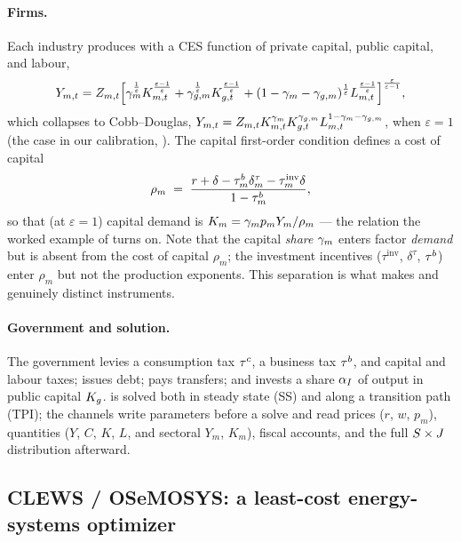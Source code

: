 \paragraph{Firms.}
Each industry produces with a CES function of private capital, public capital, and
labour,
\begin{equation}
  Y_{m,t} = Z_{m,t}\Bigl[\gamma_{m}^{\frac1\varepsilon}K_{m,t}^{\frac{\varepsilon-1}\varepsilon}
    + \gamma_{g,m}^{\frac1\varepsilon}K_{g,t}^{\frac{\varepsilon-1}\varepsilon}
    + (1-\gamma_{m}-\gamma_{g,m})^{\frac1\varepsilon}L_{m,t}^{\frac{\varepsilon-1}\varepsilon}\Bigr]
    ^{\frac\varepsilon{\varepsilon-1}},
  \label{eq:prod}
\end{equation}
which collapses to Cobb--Douglas, $Y_{m,t}=Z_{m,t}K_{m,t}^{\gamma_{m}}K_{g,t}^{\gamma_{g,m}}
L_{m,t}^{1-\gamma_{m}-\gamma_{g,m}}$, when $\varepsilon=1$ (the case in our calibration,
). The capital first-order condition defines a cost of capital
\begin{equation}
  \rho_m \;=\; \frac{r+\delta-\tau^{b}_m\delta^{\tau}_m-\tau^{\mathrm{inv}}_m\delta}{1-\tau^{b}_m},
  \label{eq:rho}
\end{equation}
so that (at $\varepsilon=1$) capital demand is $K_m=\gamma_{m} p_m Y_m/\rho_m$ --- the relation
the worked example of  turns on. Note that the capital \emph{share}
$\gamma_{m}$ enters factor \emph{demand} but is absent from the cost of capital $\rho_m$;
the investment incentives ($\tau^{\mathrm{inv}}$, $\delta^{\tau}$, $\tau^{b}$) enter $\rho_m$
but not the production exponents. This separation is what makes 
and  genuinely distinct instruments.

\paragraph{Government and solution.}
The government levies a consumption tax $\tau^{c}$, a business tax $\tau^{b}$, and capital and
labour taxes; issues debt; pays transfers; and invests a share $\alpha_{I}$ of output in
public capital $K_{g}$. \OGCore{} is solved both in steady state (SS) and along a
transition path (TPI); the channels write parameters before a solve and read prices
($r$, $w$, $p_m$), quantities ($Y$, $C$, $K$, $L$, and sectoral $Y_m$, $K_m$), fiscal
accounts, and the full $S\times J$ distribution afterward.

\subsection{CLEWS / OSeMOSYS: a least-cost energy-systems optimizer}
\label{sec:clews}

